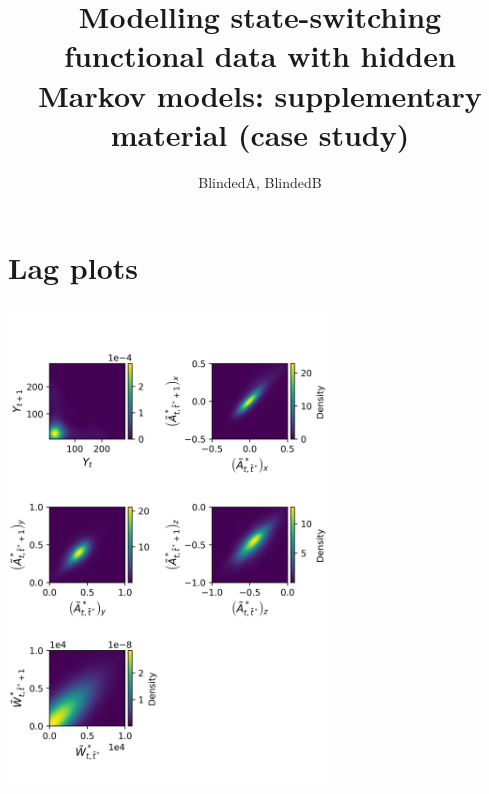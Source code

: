 \documentclass{article}
\begin{document}



\title{Modelling state-switching functional data with hidden Markov models: supplementary material (case study)}%
\date{}
\author{BlindedA, BlindedB}%


\maketitle

\addtocounter{tablenum}{1}
\addtocounter{fignum}{1}

    \section{Lag plots}
        
        \begin{center}
        \includegraphics[height=5in]{../Plots/2019/20190902-182840-CATs_OB_1_0_267_CarHHMM2_lagplot.png}
        \end{center}
        
\end{document}
